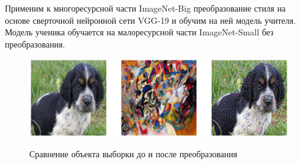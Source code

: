 \begin{table}[h!t]
\begin{center}
\caption{Структура ученика}
\label{table_12}
\end{center}
\end{table}

Применим к многоресурсной части ImageNet-Big преобразование стиля на основе сверточной нейронной сети VGG-19 и обучим на ней модель учителя. Модель ученика обучается на малоресурсной части ImageNet-Small без преобразования.

\begin{figure}[h!t]\center
{\includegraphics[width=1.0 \textwidth]{results/styletransfer.png}}
\caption{Сравнение объекта выборки до и после преобразования}
\end{figure}

